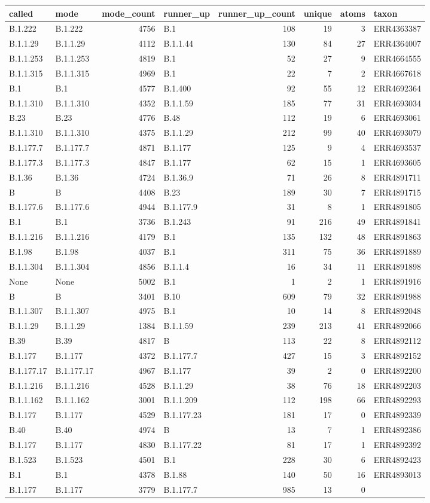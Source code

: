 \documentclass[
]{article}
\begin{document}
\begin{longtable}[]{@{}llrlrrrl@{}}
\toprule
called & mode & mode\_count & runner\_up & runner\_up\_count & unique &
atoms & taxon\tabularnewline
\midrule
\endhead
B.1.222 & B.1.222 & 4756 & B.1 & 108 & 19 & 3 &
ERR4363387\tabularnewline
B.1.1.29 & B.1.1.29 & 4112 & B.1.1.44 & 130 & 84 & 27 &
ERR4364007\tabularnewline
B.1.1.253 & B.1.1.253 & 4819 & B.1 & 52 & 27 & 9 &
ERR4664555\tabularnewline
B.1.1.315 & B.1.1.315 & 4969 & B.1 & 22 & 7 & 2 &
ERR4667618\tabularnewline
B.1 & B.1 & 4577 & B.1.400 & 92 & 55 & 12 & ERR4692364\tabularnewline
B.1.1.310 & B.1.1.310 & 4352 & B.1.1.59 & 185 & 77 & 31 &
ERR4693034\tabularnewline
B.23 & B.23 & 4776 & B.48 & 112 & 19 & 6 & ERR4693061\tabularnewline
B.1.1.310 & B.1.1.310 & 4375 & B.1.1.29 & 212 & 99 & 40 &
ERR4693079\tabularnewline
B.1.177.7 & B.1.177.7 & 4871 & B.1.177 & 125 & 9 & 4 &
ERR4693537\tabularnewline
B.1.177.3 & B.1.177.3 & 4847 & B.1.177 & 62 & 15 & 1 &
ERR4693605\tabularnewline
B.1.36 & B.1.36 & 4724 & B.1.36.9 & 71 & 26 & 8 &
ERR4891711\tabularnewline
B & B & 4408 & B.23 & 189 & 30 & 7 & ERR4891715\tabularnewline
B.1.177.6 & B.1.177.6 & 4944 & B.1.177.9 & 31 & 8 & 1 &
ERR4891805\tabularnewline
B.1 & B.1 & 3736 & B.1.243 & 91 & 216 & 49 & ERR4891841\tabularnewline
B.1.1.216 & B.1.1.216 & 4179 & B.1 & 135 & 132 & 48 &
ERR4891863\tabularnewline
B.1.98 & B.1.98 & 4037 & B.1 & 311 & 75 & 36 & ERR4891889\tabularnewline
B.1.1.304 & B.1.1.304 & 4856 & B.1.1.4 & 16 & 34 & 11 &
ERR4891898\tabularnewline
None & None & 5002 & B.1 & 1 & 2 & 1 & ERR4891916\tabularnewline
B & B & 3401 & B.10 & 609 & 79 & 32 & ERR4891988\tabularnewline
B.1.1.307 & B.1.1.307 & 4975 & B.1 & 10 & 14 & 8 &
ERR4892048\tabularnewline
B.1.1.29 & B.1.1.29 & 1384 & B.1.1.59 & 239 & 213 & 41 &
ERR4892066\tabularnewline
B.39 & B.39 & 4817 & B & 113 & 22 & 8 & ERR4892112\tabularnewline
B.1.177 & B.1.177 & 4372 & B.1.177.7 & 427 & 15 & 3 &
ERR4892152\tabularnewline
B.1.177.17 & B.1.177.17 & 4967 & B.1.177 & 39 & 2 & 0 &
ERR4892200\tabularnewline
B.1.1.216 & B.1.1.216 & 4528 & B.1.1.29 & 38 & 76 & 18 &
ERR4892203\tabularnewline
B.1.1.162 & B.1.1.162 & 3001 & B.1.1.209 & 112 & 198 & 66 &
ERR4892293\tabularnewline
B.1.177 & B.1.177 & 4529 & B.1.177.23 & 181 & 17 & 0 &
ERR4892339\tabularnewline
B.40 & B.40 & 4974 & B & 13 & 7 & 1 & ERR4892386\tabularnewline
B.1.177 & B.1.177 & 4830 & B.1.177.22 & 81 & 17 & 1 &
ERR4892392\tabularnewline
B.1.523 & B.1.523 & 4501 & B.1 & 228 & 30 & 6 &
ERR4892423\tabularnewline
B.1 & B.1 & 4378 & B.1.88 & 140 & 50 & 16 & ERR4893013\tabularnewline
B.1.177 & B.1.177 & 3779 & B.1.177.7 & 985 & 13 & 0 &

\end{longtable}
\end{document}
